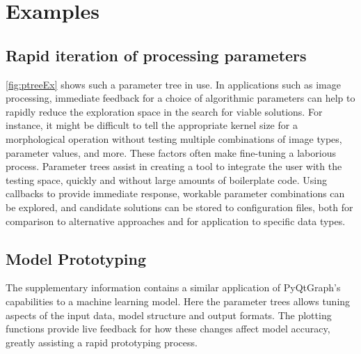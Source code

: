 
\section{Examples}\label{sec:examples}

\subsection{Rapid iteration of processing parameters}

\autoref{fig:ptreeEx} shows such a parameter tree in use. In applications such as image processing, immediate feedback for a choice of algorithmic parameters can help to rapidly reduce the exploration space in the search for viable solutions. For instance, it might be difficult to tell the appropriate kernel size for a morphological operation without testing multiple combinations of image types, parameter values, and more. These factors often make fine-tuning a laborious process. Parameter trees assist in creating a tool to integrate the user with the testing space, quickly and without large amounts of boilerplate code. Using callbacks to provide immediate response, workable parameter combinations can be explored, and candidate solutions can be stored to configuration files, both for comparison to alternative approaches and for application to specific data types.
\makePtreeExFig

\subsection{Model Prototyping}
The supplementary information contains a similar application of PyQtGraph's capabilities to a machine learning model. Here the parameter trees allows tuning aspects of the input data, model structure and output formats. The plotting functions provide live feedback for how these changes affect model accuracy, greatly assisting a rapid prototyping process.


